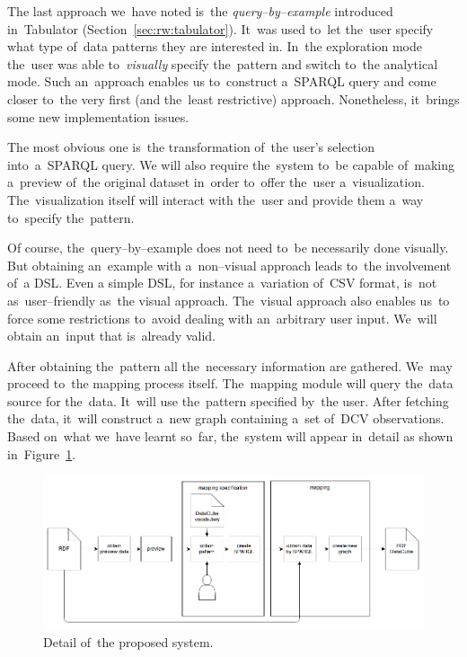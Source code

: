 The last approach we~have noted is~the \emph{query--by--example} introduced in~Tabulator (Section~\ref{sec:rw:tabulator}). It~was used to~let the~user specify what type of~data patterns they are 
interested in. In~the exploration mode the~user was able to~\emph{visually} 
specify the~pattern and switch to~the analytical mode. Such an~approach enables 
us to~construct a~SPARQL query and come closer to~the very first (and the~least restrictive) 
approach. Nonetheless, it~brings some new implementation issues.

The most obvious one is~the transformation of~the user's selection into~a~SPARQL query. 
We will also require the~system to~be capable of~making a~preview of~the 
original dataset in~order to~offer the~user a~visualization. The~visualization 
itself will interact with the~user and provide them a~way to~specify the~pattern.

Of course, the~query--by--example does not need to~be necessarily done visually. But 
obtaining an~example with a~non--visual approach leads to~the involvement of~a DSL. Even 
a simple DSL, for instance a~variation of~CSV format, is~not as~user--friendly as~the visual approach. The~visual approach also enables us~to force some 
restrictions to~avoid dealing with an~arbitrary user input. We~will 
obtain an~input that is~already valid.

After obtaining the~pattern all the~necessary information are gathered. We~may proceed to~the mapping process itself. The~mapping module will query the~data source for the~data. It~will use the~pattern specified by~the user. After 
fetching the~data, it~will construct a~new graph containing a~set of~DCV 
observations. Based on~what we~have learnt so~far, the~system will appear in~detail 
as shown in~Figure~\ref{fig:generic-mapping-detail}.

\begin{figure}
	\centering
	\includegraphics[width=140mm]{img/generic-mapping-detail.png}
	\caption{Detail of~the proposed system.}
	\label{fig:generic-mapping-detail}
\end{figure}


